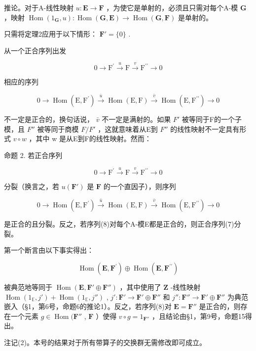 推论。对于A-线性映射 \(u: \mathbf{E} \to \mathbf{F}\) ，为使它是单射的，必须且只需对每个A-模 \(\mathbf{G}\) ，映射 \(\operatorname{Hom}(1_{\mathbf{G}}, u): \operatorname{Hom}(\mathbf{G}, \mathbf{E}) \to \operatorname{Hom}(\mathbf{G}, \mathbf{F})\) 是单射的。

只需将定理2应用于以下情形： \(\mathbf{F}' = \{0\}\) .

从一个正合序列出发

\[
0 \longrightarrow \mathrm{F} ^ {\prime} \stackrel {u} {\longrightarrow} \mathrm{F} \stackrel {v} {\longrightarrow} \mathrm{F} ^ {\prime \prime} \longrightarrow 0
\]

相应的序列

\[
0 \longrightarrow \operatorname{Hom} (\mathrm{E}, \mathrm{F} ^ {\prime}) \stackrel {\bar {u}} {\longrightarrow} \operatorname{Hom} (\mathrm{E}, \mathrm{F}) \stackrel {\bar {v}} {\longrightarrow} \operatorname{Hom} (\mathrm{E}, \mathrm{F} ^ {\prime \prime}) \longrightarrow 0
\]

不一定是正合的，换句话说， \(\bar{v}\) 不一定是满射的。如果 \(F'\) 被等同于F的一个子模，且 \(F''\) 被等同于商模 \(F/F'\) ，这就意味着从E到 \(F''\) 的线性映射不一定具有形式 \(v \circ w\) ，其中 w 是从E到F的线性映射。然而：

命题 2. 若正合序列

\[
0 \longrightarrow \mathrm{F} ^ {\prime} \stackrel {u} {\longrightarrow} \mathrm{F} \stackrel {v} {\longrightarrow} \mathrm{F} ^ {\prime \prime} \longrightarrow 0\tag{7}
\]

分裂（换言之，若 \(u(\mathbf{F}')\) 是 \(\mathbf{F}\) 的一个直因子），则序列

\[
0 \longrightarrow \operatorname{Hom} (\mathrm{E}, \mathrm{F} ^ {\prime}) \stackrel {\bar {u}} {\longrightarrow} \operatorname{Hom} (\mathrm{E}, \mathrm{F}) \stackrel {\bar {v}} {\longrightarrow} \operatorname{Hom} (\mathrm{E}, \mathrm{F} ^ {\prime \prime}) \longrightarrow 0\tag{8}
\]

是正合的且分裂。反之，若序列(8)对每个A-模E都是正合的，则正合序列(7)分裂。

第一个断言由以下事实得出：

\[
\operatorname{Hom} (\mathbf {E}, \mathbf {F} ^ {\prime}) \oplus \operatorname{Hom} (\mathbf {E}, \mathbf {F} ^ {\prime \prime})
\]

被典范地等同于 \(\operatorname{Hom}(\mathbf{E}, \mathbf{F}' \oplus \mathbf{F}'')\) ，其中使用了 \(\mathbf{Z}\) -线性映射 \(\operatorname{Hom}(1_{\mathbb{E}}, j') + \operatorname{Hom}(1_{\mathbb{E}}, j'')\) , \(j': \mathbf{F}' \to \mathbf{F}' \oplus \mathbf{F}''\) 和 \(j'': \mathbf{F}'' \to \mathbf{F}' \oplus \mathbf{F}''\) 为典范嵌入（§1，第6号，命题6的推论1）。反之，若序列(8)对 \(\mathbf{E} = \mathbf{F}''\) 是正合的，则存在一个元素 \(g \in \operatorname{Hom}(\mathbf{F}''\) , \(\mathbf{F}\) ）使得 \(v \circ g = 1_{\mathbf{F}''}\) ，且结论由§1，第9号，命题15得出。

注记(2)。本号的结果对于所有带算子的交换群无需修改即可成立。

